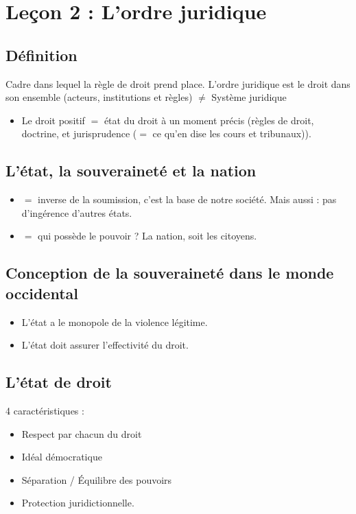 \newpage
\chapter{Leçon 2 : L'ordre juridique}

\section{Définition}

Cadre dans lequel la règle de droit prend place. L'ordre juridique est le droit dans son ensemble (acteurs, institutions et règles) $\neq$ Système juridique

\begin{itemize}
    \item Le droit positif $=$ état du droit à un moment précis (règles de droit, doctrine, et jurisprudence ($=$ ce qu'en dise les cours et tribunaux)).
\end{itemize}

\section{L'état, la souveraineté et la nation}

\begin{itemize}
    \item {} $=$ inverse de la soumission, c'est la base de notre société. Mais aussi : pas d'ingérence d'autres états.
    \item {} $=$ qui possède le pouvoir ? La nation, soit les citoyens.
\end{itemize}

\section{Conception de la souveraineté dans le monde occidental}

\begin{itemize}
    \item L'état a le monopole de la violence légitime.
    \item L'état doit assurer l'effectivité du droit.
\end{itemize}

\section{L'état de droit}

4 caractéristiques :
\begin{itemize}
    \item Respect par chacun du droit
    \item Idéal démocratique
    \item Séparation / Équilibre des pouvoirs
    \item Protection juridictionnelle.
\end{itemize}

